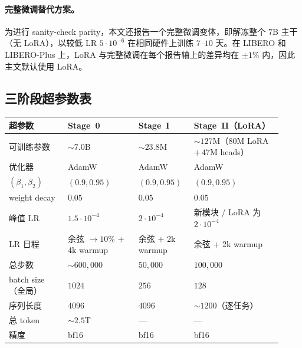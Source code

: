 \paragraph{完整微调替代方案。}
为进行 sanity-check parity，本文还报告一个完整微调变体，即解冻整个 $7$B 主干（无 LoRA），以较低 LR $5\!\cdot\!10^{-6}$ 在相同硬件上训练 $7$--$10$ 天。在 LIBERO 和 LIBERO-Plus 上，LoRA 与完整微调在每个报告轴上的差异均在 $\pm\!1$\% 内，因此主文默认使用 LoRA。

\subsection*{三阶段超参数表}

\begin{center}
\scriptsize
\setlength{\tabcolsep}{4pt}
\begin{tabular}{p{0.20\linewidth}p{0.24\linewidth}p{0.18\linewidth}p{0.30\linewidth}}
\toprule
超参数 & Stage~0 & Stage~I & Stage~II（LoRA） \\
\midrule
可训练参数         & $\sim\!7.0$B                              & $\sim\!23.8$M           & $\sim\!127$M（$80$M LoRA $+\,47$M heads） \\
优化器                & AdamW                                     & AdamW                   & AdamW \\
$(\beta_1,\beta_2)$      & $(0.9, 0.95)$                             & $(0.9, 0.95)$           & $(0.9, 0.95)$ \\
weight decay             & $0.05$                                    & $0.05$                  & $0.05$ \\
峰值 LR                  & $1.5\!\cdot\!10^{-4}$                     & $2\!\cdot\!10^{-4}$     & 新模块 / LoRA 为 $2\!\cdot\!10^{-4}$ \\
LR 日程              & 余弦 $\to\!10\%$ + 4k warmup            & 余弦 + 2k warmup      & 余弦 + 2k warmup \\
总步数              & $\sim\!600{,}000$                         & $50{,}000$              & $100{,}000$ \\
batch size（全局）      & $1024$                                    & $256$                   & $128$ \\
序列长度          & $4096$                                    & $4096$                  & $\sim\!1200$（逐任务） \\
总 token             & $\sim\!2.5$T                              & ---                     & --- \\
精度                & bf16                                      & bf16                    & bf16 \\

\end{tabular}
\end{center}
